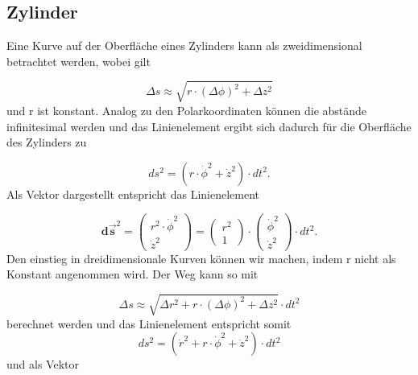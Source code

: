 %
%
%
%
\subsection{Zylinder\label{geodaeten:section:LinZylinder}}

Eine Kurve auf der Oberfläche eines Zylinders kann als zweidimensional betrachtet werden, wobei gilt

\begin{equation}
	\Delta s \approx \sqrt{r \cdot (\Delta \phi)^2 + \Delta z^2}
\end{equation}
und r ist konstant.
Analog zu den Polarkoordinaten können die abstände infinitesimal werden und das Linienelement ergibt sich dadurch für die Oberfläche des Zylinders zu

\begin{equation}
	ds^2 = \left(r \cdot \dot{\phi}^2 +\dot{z}^2\right) \cdot dt^2 .
\end{equation}
Als Vektor dargestellt entspricht das Linienelement

\begin{equation}
	\mathbf{d\vec{s}}^2 = \begin{pmatrix} r^2 \cdot \dot{\phi}^2 \\ \dot{z}^2 \end{pmatrix} = \begin{pmatrix} r^2 \\ 1 \end{pmatrix} \cdot \begin{pmatrix} \dot{\phi}^2 \\ \dot{z}^2 \end{pmatrix} \cdot dt^2 .
\end{equation}
Den einstieg in dreidimensionale Kurven können wir machen, indem r nicht als Konstant angenommen wird.
Der Weg kann so mit

\begin{equation}
	\Delta s \approx \sqrt{\Delta r^2 + r \cdot (\Delta \phi)^2 + \Delta z^2} \cdot dt^2
\end{equation}
berechnet werden und das Linienelement entspricht somit
\begin{equation}
	ds^2 = \left(\dot{r}^2 + r \cdot \dot{\phi}^2 +\dot{z}^2\right) \cdot dt^2
\end{equation}
und als Vektor

